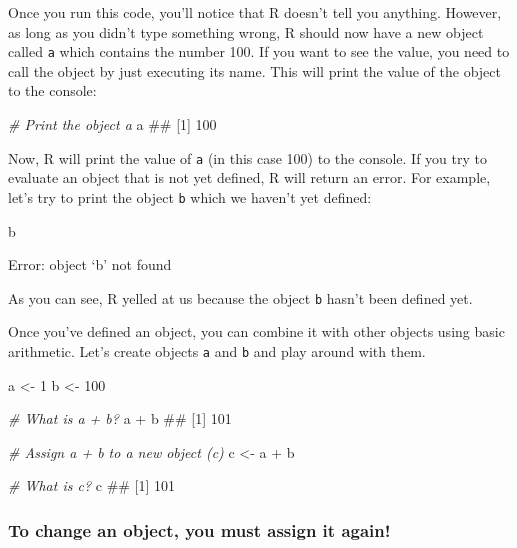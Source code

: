 \documentclass[]{book}
\newenvironment{Shaded}{\begin{snugshade}}{\end{snugshade}}
\newcommand{\DecValTok}[1]{\textcolor[rgb]{0.00,0.00,0.81}{{#1}}}
\newcommand{\StringTok}[1]{\textcolor[rgb]{0.31,0.60,0.02}{{#1}}}
\newcommand{\CommentTok}[1]{\textcolor[rgb]{0.56,0.35,0.01}{\textit{{#1}}}}
\newcommand{\NormalTok}[1]{{#1}}
\theoremstyle{definition}
\theoremstyle{definition}
\theoremstyle{remark}
\begin{document}
Once you run this code, you'll notice that R doesn't tell you anything.
However, as long as you didn't type something wrong, R should now have a
new object called \texttt{a} which contains the number 100. If you want
to see the value, you need to call the object by just executing its
name. This will print the value of the object to the console:

\begin{Shaded}
\begin{Highlighting}[]
\CommentTok{# Print the object a}
\NormalTok{a}
\NormalTok{## [1] 100}
\end{Highlighting}
\end{Shaded}

Now, R will print the value of \texttt{a} (in this case 100) to the
console. If you try to evaluate an object that is not yet defined, R
will return an error. For example, let's try to print the object
\texttt{b} which we haven't yet defined:

\begin{Shaded}
\begin{Highlighting}[]
\NormalTok{b}
\end{Highlighting}
\end{Shaded}

Error: object `b' not found

As you can see, R yelled at us because the object \texttt{b} hasn't been
defined yet.

Once you've defined an object, you can combine it with other objects
using basic arithmetic. Let's create objects \texttt{a} and \texttt{b}
and play around with them.

\begin{Shaded}
\begin{Highlighting}[]
\NormalTok{a <-}\StringTok{ }\DecValTok{1}
\NormalTok{b <-}\StringTok{ }\DecValTok{100}

\CommentTok{# What is a + b?}
\NormalTok{a +}\StringTok{ }\NormalTok{b}
\NormalTok{## [1] 101}

\CommentTok{# Assign a + b to a new object (c)}
\NormalTok{c <-}\StringTok{ }\NormalTok{a +}\StringTok{ }\NormalTok{b}

\CommentTok{# What is c?}
\NormalTok{c}
\NormalTok{## [1] 101}
\end{Highlighting}
\end{Shaded}

\subsubsection{To change an object, you must assign it
again!}\label{to-change-an-object-you-must-assign-it-again}
\end{document}
